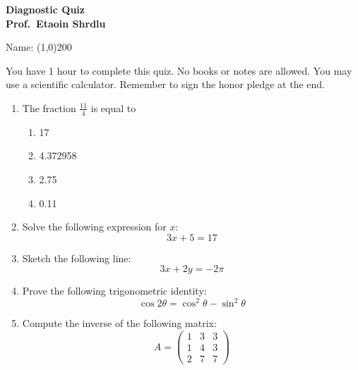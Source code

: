 \documentclass[12pt]{article}
\begin{document}
\Large \textbf{Diagnostic Quiz \\ Prof.~Etaoin Shrdlu}
\normalsize

\vspace{0.3in} %
Name: \line(1,0){200} %


You have 1 hour to complete this quiz. No books or notes are
allowed. You may use a scientific calculator. Remember to sign the
honor pledge at the end.

\begin{enumerate} %
\item The fraction $\frac{11}{4}$ is equal to
  \begin{enumerate} %
    \item 17
    \item 4.372958
    \item 2.75
    \item 0.11
  \end{enumerate}


\item Solve the following expression for $x$:
\begin{equation*}
 3x + 5 = 17
\end{equation*}
\vspace{0.75in}

\item Sketch the following line:
\begin{equation*}
3x + 2y = -2\pi
\end{equation*}
\vspace{1.25in}

\pagebreak

\item Prove the following trigonometric identity:
\begin{equation*}
\cos 2\theta = \cos^2\theta - \sin^2\theta
\end{equation*}

\vspace{1in}

\item Compute the inverse of the following matrix:
\begin{equation*}
A = \begin{pmatrix} 
1 & 3 & 3 \\
1 & 4 & 3 \\
2 & 7 & 7
\end{pmatrix}
\end{equation*}
\vspace{1.25in}


\end{enumerate}
\end{document}
